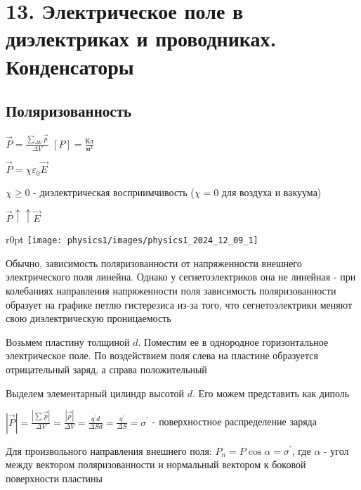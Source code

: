 \documentclass[12pt]{article}
\begin{document}






\section{13. Электрическое поле в диэлектриках и проводниках. Конденсаторы}

\subsection{Поляризованность}

$\vec{P} = \frac{\sum_{\Delta V} \vec{p}}{\Delta V}$ \hfill $[P] = \frac{\text{Кл}}{\text{м}^2}$

$\vec{P} = \chi \varepsilon_0 \vec{E}$

$\chi \geq 0$ - диэлектрическая восприимчивость ($\chi = 0$ для воздуха и вакуума)

$\vec{P} \uparrow\uparrow \vec{E}$

\begin{minipage}{\textwidth}
    \begin{wrapfigure}{r}{0pt}
        \texttt{[image: physics1/images/physics1\_2024\_12\_09\_1]}
    \end{wrapfigure}

    Обычно, зависимость поляризованности от напряженности внешнего электрического поля линейна. 
    Однако у сегнетоэлектриков она не линейная - при колебаниях направления напряженности поля зависимость поляризованности
    образует на графике петлю гистерезиса из-за того, что сегнетоэлектрики меняют свою диэлектрическую проницаемость

    Возьмем пластину толщиной $d$. Поместим ее в однородное горизонтальное электрическое поле. 
    По воздействием поля слева на пластине образуется отрицательный заряд, а справа положительный

    Выделем элементарный цилиндр высотой $d$. Его можем представить как диполь

    $|\vec{P}| = \frac{|\sum \vec{p}|}{\Delta V} = \frac{|\vec{p}|}{\Delta V} = \frac{q^\prime d}{\Delta S d} = \frac{q^\prime}{\Delta S} = \sigma^\prime$ - поверхностное распределение заряда

    Для произвольного направления внешнего поля: $P_n = P \cos\alpha = \sigma^\prime$, где $\alpha$ - угол между вектором поляризованности и нормальный вектором к боковой поверхности пластины

\end{minipage}
\end{document}
